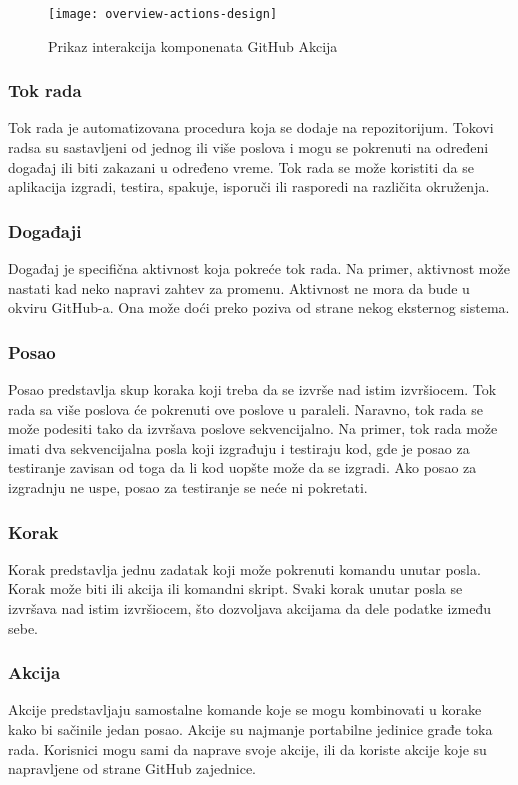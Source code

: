 \begin{figure}[h]
    \centering
    \texttt{[image: overview-actions-design]}
    \caption{Prikaz interakcija komponenata GitHub Akcija}
\end{figure}

\subsubsection{Tok rada}
Tok rada je automatizovana procedura koja se dodaje na repozitorijum. Tokovi radsa su sastavljeni 
od jednog ili više poslova i mogu se pokrenuti na određeni događaj ili biti zakazani u određeno vreme. 
Tok rada se može koristiti da se aplikacija izgradi, testira, spakuje, isporuči ili rasporedi na 
različita okruženja.

\subsubsection{Događaji}
Događaj je specifična aktivnost koja pokreće tok rada. Na primer, aktivnost može nastati kad neko napravi 
zahtev za promenu. Aktivnost ne mora da bude u okviru GitHub-a. Ona može doći preko poziva od strane 
nekog eksternog sistema.

\subsubsection{Posao}
Posao predstavlja skup koraka koji treba da se izvrše nad istim izvršiocem. Tok rada sa više poslova 
će pokrenuti ove poslove u paraleli. Naravno, tok rada se može podesiti tako da izvršava poslove 
sekvencijalno. Na primer, tok rada može imati dva sekvencijalna posla koji izgrađuju i testiraju kod, 
gde je posao za testiranje zavisan od toga da li kod uopšte može da se izgradi. Ako posao za izgradnju 
ne uspe, posao za testiranje se neće ni pokretati.

\subsubsection{Korak}
Korak predstavlja jednu zadatak koji može pokrenuti komandu unutar posla. Korak može biti ili akcija ili 
komandni skript. Svaki korak unutar posla se izvršava nad istim izvršiocem, što dozvoljava akcijama da 
dele podatke između sebe.

\subsubsection{Akcija}
Akcije predstavljaju samostalne komande koje se mogu kombinovati u korake kako bi sačinile jedan posao.
Akcije su najmanje portabilne jedinice građe toka rada. Korisnici mogu sami da naprave svoje akcije,
ili da koriste akcije koje su napravljene od strane GitHub zajednice. 

